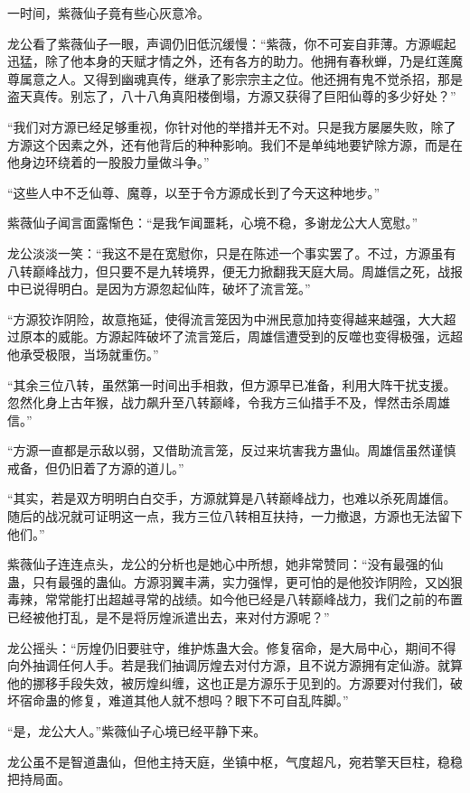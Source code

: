 \begin{this_body}
一时间，紫薇仙子竟有些心灰意冷。

龙公看了紫薇仙子一眼，声调仍旧低沉缓慢：“紫薇，你不可妄自菲薄。方源崛起迅猛，除了他本身的天赋才情之外，还有各方的助力。他拥有春秋蝉，乃是红莲魔尊属意之人。又得到幽魂真传，继承了影宗宗主之位。他还拥有鬼不觉杀招，那是盗天真传。别忘了，八十八角真阳楼倒塌，方源又获得了巨阳仙尊的多少好处？”

“我们对方源已经足够重视，你针对他的举措并无不对。只是我方屡屡失败，除了方源这个因素之外，还有他背后的种种影响。我们不是单纯地要铲除方源，而是在他身边环绕着的一股股力量做斗争。”

“这些人中不乏仙尊、魔尊，以至于令方源成长到了今天这种地步。”

紫薇仙子闻言面露惭色：“是我乍闻噩耗，心境不稳，多谢龙公大人宽慰。”

龙公淡淡一笑：“我这不是在宽慰你，只是在陈述一个事实罢了。不过，方源虽有八转巅峰战力，但只要不是九转境界，便无力掀翻我天庭大局。周雄信之死，战报中已说得明白。是因为方源忽起仙阵，破坏了流言笼。”

“方源狡诈阴险，故意拖延，使得流言笼因为中洲民意加持变得越来越强，大大超过原本的威能。方源起阵破坏了流言笼后，周雄信遭受到的反噬也变得极强，远超他承受极限，当场就重伤。”

“其余三位八转，虽然第一时间出手相救，但方源早已准备，利用大阵干扰支援。忽然化身上古年猴，战力飙升至八转巅峰，令我方三仙措手不及，悍然击杀周雄信。”

“方源一直都是示敌以弱，又借助流言笼，反过来坑害我方蛊仙。周雄信虽然谨慎戒备，但仍旧着了方源的道儿。”

“其实，若是双方明明白白交手，方源就算是八转巅峰战力，也难以杀死周雄信。随后的战况就可证明这一点，我方三位八转相互扶持，一力撤退，方源也无法留下他们。”

紫薇仙子连连点头，龙公的分析也是她心中所想，她非常赞同：“没有最强的仙蛊，只有最强的蛊仙。方源羽翼丰满，实力强悍，更可怕的是他狡诈阴险，又凶狠毒辣，常常能打出超越寻常的战绩。如今他已经是八转巅峰战力，我们之前的布置已经被他打乱，是不是将厉煌派遣出去，来对付方源呢？”

龙公摇头：“厉煌仍旧要驻守，维护炼蛊大会。修复宿命，是大局中心，期间不得向外抽调任何人手。若是我们抽调厉煌去对付方源，且不说方源拥有定仙游。就算他的挪移手段失效，被厉煌纠缠，这也正是方源乐于见到的。方源要对付我们，破坏宿命蛊的修复，难道其他人就不想吗？眼下不可自乱阵脚。”

“是，龙公大人。”紫薇仙子心境已经平静下来。

龙公虽不是智道蛊仙，但他主持天庭，坐镇中枢，气度超凡，宛若擎天巨柱，稳稳把持局面。


\end{this_body}
